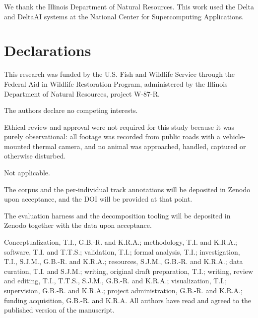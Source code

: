 \documentclass[pdflatex,sn-basic,Numbered]{sn-jnl}%
\newif\ifblind
\theoremstyle{thmstyleone}
\begin{document}
\maketitle








\backmatter

\ifblind
\bmhead{Declarations}
Funding, competing interests, ethics approval, data and code availability, author
contributions and acknowledgements are given on the separate title page, as required for
double-blind review.
\else
{}
We thank the Illinois Department of Natural Resources. This work used the Delta and DeltaAI
systems at the National Center for Supercomputing Applications.

\section*{Declarations}

This research was funded by the U.S. Fish and Wildlife Service through the Federal Aid in
Wildlife Restoration Program, administered by the Illinois Department of Natural Resources,
project W-87-R.

The authors declare no competing interests.

Ethical review and approval were not required for this study because it was purely
observational: all footage was recorded from public roads with a vehicle-mounted thermal
camera, and no animal was approached, handled, captured or otherwise disturbed.

Not applicable.

The corpus and the per-individual track annotations will be deposited in Zenodo upon
acceptance, and the DOI will be provided at that point.

The evaluation harness and the decomposition tooling will be deposited in Zenodo together
with the data upon acceptance.

Conceptualization, T.I., G.B.-R. and K.R.A.; methodology, T.I. and K.R.A.; software, T.I. and
T.T.S.; validation, T.I.; formal analysis, T.I.; investigation, T.I., S.J.M., G.B.-R. and
K.R.A.; resources, S.J.M., G.B.-R. and K.R.A.; data curation, T.I. and S.J.M.; writing,
original draft preparation, T.I.; writing, review and editing, T.I., T.T.S., S.J.M., G.B.-R.
and K.R.A.; visualization, T.I.; supervision, G.B.-R. and K.R.A.; project administration,
G.B.-R. and K.R.A.; funding acquisition, G.B.-R. and K.R.A. All authors have read and agreed
to the published version of the manuscript.
\fi
\end{document}
